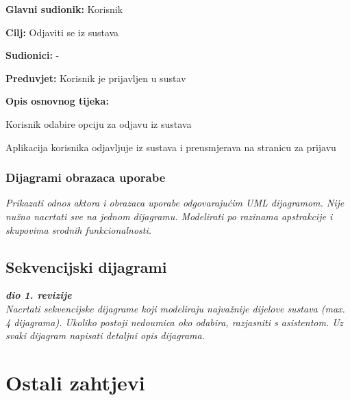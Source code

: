 					\noindent {}
					\begin{packed_item}
	
						\item \textbf{Glavni sudionik:} Korisnik
						\item  \textbf{Cilj:} Odjaviti se iz sustava
						\item  \textbf{Sudionici:} -
						\item  \textbf{Preduvjet:} Korisnik je prijavljen u sustav
						\item  \textbf{Opis osnovnog tijeka:}
						
						\item[] \begin{packed_enum}
	
							\item Korisnik odabire opciju za odjavu iz sustava
							\item Aplikacija korisnika odjavljuje iz sustava i preusmjerava na stranicu za prijavu

						\end{packed_enum}

					\end{packed_item}

					
				\subsubsection{Dijagrami obrazaca uporabe}
					
					\textit{Prikazati odnos aktora i obrazaca uporabe odgovarajućim UML dijagramom. Nije nužno nacrtati sve na jednom dijagramu. Modelirati po razinama apstrakcije i skupovima srodnih funkcionalnosti.}
				\eject		
				
			\subsection{Sekvencijski dijagrami}
				
				\textbf{\textit{dio 1. revizije}}\\
				
				\textit{Nacrtati sekvencijske dijagrame koji modeliraju najvažnije dijelove sustava (max. 4 dijagrama). Ukoliko postoji nedoumica oko odabira, razjasniti s asistentom. Uz svaki dijagram napisati detaljni opis dijagrama.}
				\eject
	
		\section{Ostali zahtjevi}
		
